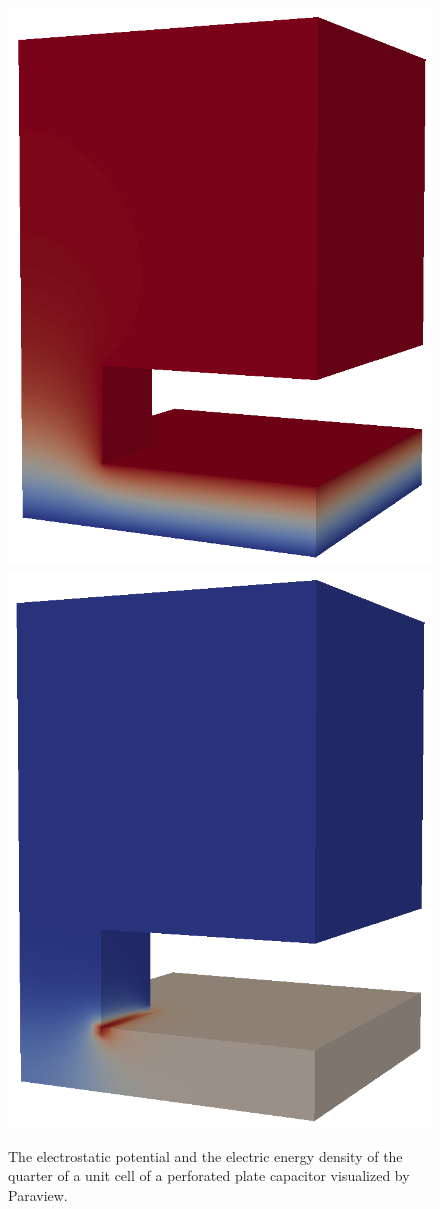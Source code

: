 \begin{figure}[h]
\centering
\includegraphics[width=70 mm]{HexholePotential}
\includegraphics[width=70 mm]{HexholeEnergyDensity}
\caption{The electrostatic potential and the electric energy density of the quarter of  a unit cell of 
a perforated plate capacitor visualized by Paraview.}
\label{fig:hexhole_pot}
\end{figure}  


\hfill



